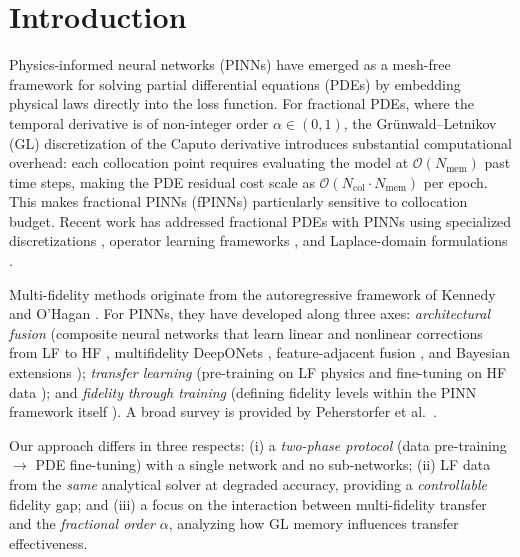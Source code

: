 \documentclass[preprint,12pt]{elsarticle}
\newcommand{\Ncol}{N_{\mathrm{col}}}
\begin{document}
\section{Introduction}
\label{sec:intro}

Physics-informed neural networks (PINNs) \cite{raissi2019physics,karniadakis2021physics,lu2021deepxde} have emerged as a mesh-free framework for solving partial differential equations (PDEs) by embedding physical laws directly into the loss function. For fractional PDEs, where the temporal derivative is of non-integer order $\alpha \in (0,1)$, the Gr\"unwald--Letnikov (GL) discretization of the Caputo derivative introduces substantial computational overhead: each collocation point requires evaluating the model at $\mathcal{O}(N_{\mathrm{mem}})$ past time steps, making the PDE residual cost scale as $\mathcal{O}(\Ncol \cdot N_{\mathrm{mem}})$ per epoch. This makes fractional PINNs (fPINNs) \cite{pang2019fpinns} particularly sensitive to collocation budget. Recent work has addressed fractional PDEs with PINNs using specialized discretizations \cite{zhao2025fdiff}, operator learning frameworks \cite{lin2025fpinn}, and Laplace-domain formulations \cite{yan2023laplace,wang2025laplace,liu2025lt}.

Multi-fidelity methods originate from the autoregressive framework of Kennedy and O'Hagan \cite{kennedy2000predicting}. For PINNs, they have developed along three axes: \emph{architectural fusion} (composite neural networks that learn linear and nonlinear corrections from LF to HF \cite{meng2020composite}, multifidelity DeepONets \cite{howard2023multifidelity}, feature-adjacent fusion \cite{chen2024feature}, and Bayesian extensions \cite{chen2026mf}); \emph{transfer learning} (pre-training on LF physics and fine-tuning on HF data \cite{chakraborty2021transfer,goswami2020transfer,de2023multifidelity}); and \emph{fidelity through training} (defining fidelity levels within the PINN framework itself \cite{muralidhar2022multifidelity}). A broad survey is provided by Peherstorfer et al.\ \cite{peherstorfer2018survey}.

Our approach differs in three respects: (i) a \emph{two-phase protocol} (data pre-training $\to$ PDE fine-tuning) with a single network and no sub-networks; (ii) LF data from the \emph{same} analytical solver at degraded accuracy, providing a \emph{controllable} fidelity gap; and (iii) a focus on the interaction between multi-fidelity transfer and the \emph{fractional order} $\alpha$, analyzing how GL memory influences transfer effectiveness.
\end{document}
